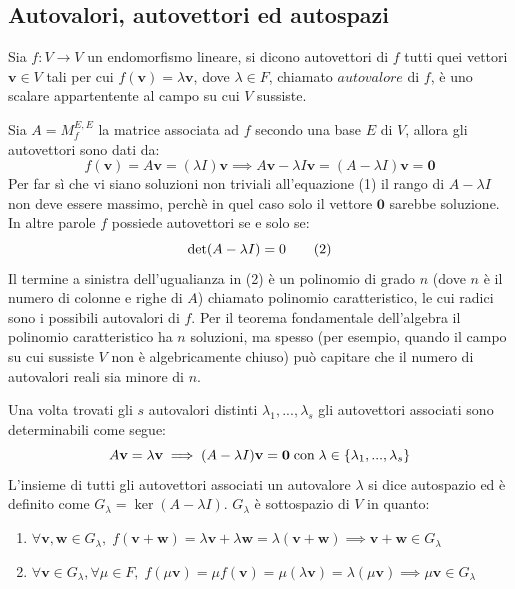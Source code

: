 \vspace{10pt}
\subsection{Autovalori, autovettori ed autospazi} \label{subsec:linappeigen}
    Sia $f : V \rightarrow V$ un endomorfismo lineare, si dicono autovettori di $f$ tutti quei vettori $\mathbf{v} \in V$ tali per cui $f(\mathbf{v}) = \lambda \mathbf{v}$, dove $\lambda \in F$, chiamato $autovalore$ di $f$, è uno scalare appartentente al campo su cui $V$ sussiste.

    \vspace{10pt}
    Sia $A = M_{f}^{E, E}$ la matrice associata ad $f$ secondo una base $E$ di $V$, allora gli autovettori sono dati da:
    \[
        f(\mathbf{v}) = A \mathbf{v} = (\lambda I) \mathbf{v} \implies A \mathbf{v} - \lambda I \mathbf{v} = (A - \lambda I) \mathbf{v} = \mathbf{0} \tag{1}
    \]
    Per far sì che vi siano soluzioni non triviali all'equazione (1) il rango di $A - \lambda I$ non deve essere massimo, perchè in quel caso solo il vettore $\mathbf{0}$ sarebbe soluzione.
    In altre parole $f$ possiede autovettori se e solo se:
    \[
        \textnormal{det}(A - \lambda I) = 0 \tag{2}
    \]
    Il termine a sinistra dell'ugualianza in (2) è un polinomio di grado $n$ (dove $n$ è il numero di colonne e righe di $A$) chiamato polinomio caratteristico,
    le cui radici sono i possibili autovalori di $f$. Per il teorema fondamentale dell'algebra il polinomio caratteristico ha $n$ soluzioni, ma spesso (per esempio, quando il campo su cui sussiste $V$ non è algebricamente chiuso) può capitare che
    il numero di autovalori reali sia minore di $n$.

    \vspace{10pt}
    Una volta trovati gli $s$ autovalori distinti $\lambda_1, ..., \lambda_s$ gli autovettori associati sono determinabili come segue:
    \[
        A \mathbf{v} = \lambda \mathbf{v} \implies (A - \lambda I) \mathbf{v} = \mathbf{0} \; \textnormal{con} \; \lambda \in \{\lambda_1, ..., \lambda_s\}
    \]
    L'insieme di tutti gli autovettori associati un autovalore $\lambda$ si dice autospazio ed è definito come $G_{\lambda} = \ker(A - \lambda I)$. $G_{\lambda}$ è sottospazio di $V$ in quanto:
    \begin{enumerate}[label=(\arabic*)]
        \item $\forall \mathbf{v}, \mathbf{w} \in G_{\lambda}, \; f(\mathbf{v} + \mathbf{w}) = \lambda \mathbf{v} + \lambda \mathbf{w} = \lambda (\mathbf{v} + \mathbf{w}) \implies \mathbf{v} + \mathbf{w} \in G_{\lambda}$
        \item $\forall \mathbf{v} \in G_{\lambda}, \forall \mu \in F, \; f(\mu \mathbf{v}) = \mu f(\mathbf{v}) = \mu (\lambda \mathbf{v}) = \lambda (\mu \mathbf{v}) \implies \mu \mathbf{v} \in G_{\lambda}$
    \end{enumerate}

